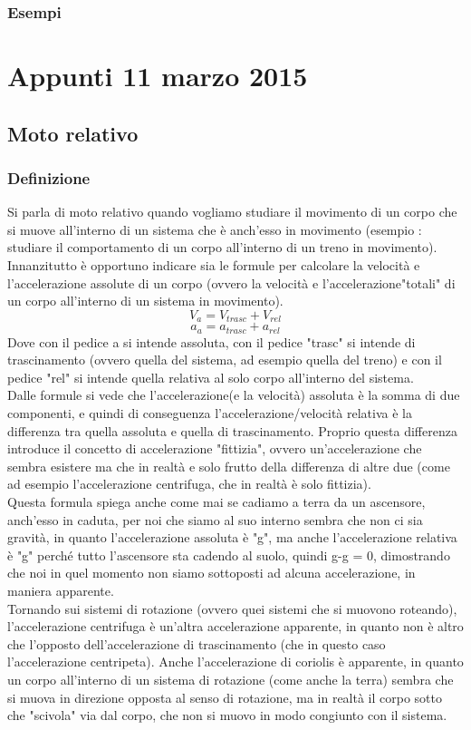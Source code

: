 \documentclass[portait]{article}
\begin{document}
\subsubsection{Esempi}
\newpage
\section{Appunti 11 marzo 2015}
\subsection{Moto relativo}
\subsubsection{Definizione}
Si parla di moto relativo quando vogliamo studiare il movimento di un corpo che si muove all'interno di un sistema che è anch'esso in movimento (esempio : studiare il comportamento di un corpo all'interno di un treno in movimento). \\
Innanzitutto è opportuno indicare sia le formule per calcolare la velocità e l'accelerazione assolute di un corpo (ovvero la velocità e l'accelerazione"totali" di un corpo all'interno di un sistema in movimento).
$$V_a = V_{trasc}  + V_{rel}$$
$$a_a = a_{trasc}  + a_{rel}$$
Dove con il pedice a si intende assoluta, con il pedice "trasc" si intende di trascinamento (ovvero quella del sistema, ad esempio quella del treno) e con il pedice "rel" si intende quella relativa al solo corpo all'interno del sistema. \\
Dalle formule si vede che l'accelerazione(e la velocità) assoluta è la somma di due componenti, e quindi di conseguenza l'accelerazione/velocità relativa è la differenza tra quella assoluta e quella di trascinamento. Proprio questa differenza introduce il concetto di accelerazione "fittizia", ovvero un'accelerazione che sembra esistere ma che in realtà e solo frutto della differenza di altre due (come ad esempio l'accelerazione centrifuga, che in realtà è solo fittizia). \\
Questa formula spiega anche come mai se cadiamo a terra da un ascensore, anch'esso in caduta, per noi che siamo al suo interno sembra che non ci sia gravità, in quanto l'accelerazione assoluta è "g", ma anche l'accelerazione relativa è "g" perché tutto l'ascensore sta cadendo al suolo, quindi g-g = 0, dimostrando che noi in quel momento non siamo sottoposti ad alcuna accelerazione, in maniera apparente. \\
Tornando sui sistemi di rotazione (ovvero quei sistemi che si muovono roteando), l'accelerazione centrifuga è un'altra accelerazione apparente, in quanto non è altro che l'opposto dell'accelerazione di trascinamento (che in questo caso l'accelerazione centripeta).
Anche l'accelerazione di coriolis è apparente, in quanto un corpo all'interno di un sistema di rotazione (come anche la terra) sembra che si muova in direzione opposta al senso di rotazione, ma in realtà il corpo sotto che "scivola" via dal corpo, che non si muovo in modo congiunto con il sistema.
\end{document}
